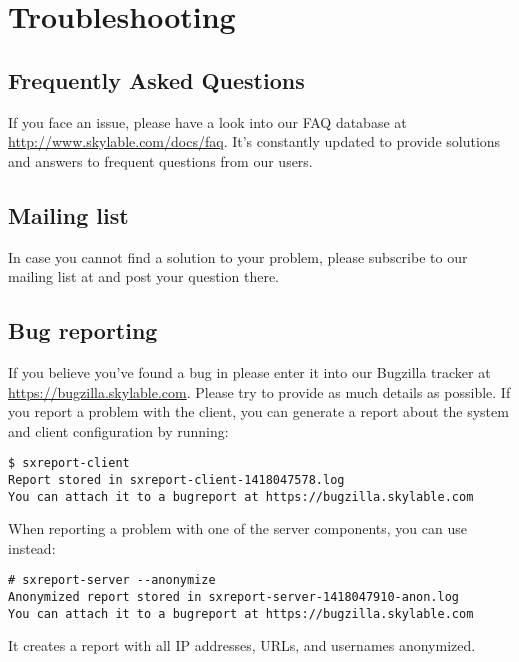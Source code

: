 \chapter{Troubleshooting}

\section{Frequently Asked Questions}
If you face an issue, please have a look into our FAQ database
at \url{http://www.skylable.com/docs/faq}. It's constantly
updated to provide solutions and answers to frequent questions
from our users.

\section{Mailing list}
In case you cannot find a solution to your problem, please
subscribe to our mailing list  at
 and post your question there.

\section{Bug reporting}
If you believe you've found a bug in \SX please enter it into
our Bugzilla tracker at \url{https://bugzilla.skylable.com}.
Please try to provide as much details as possible. If you
report a problem with the client, you can generate a report about
the system and client configuration by running:
\begin{lstlisting}
$ sxreport-client
Report stored in sxreport-client-1418047578.log
You can attach it to a bugreport at https://bugzilla.skylable.com
\end{lstlisting}
When reporting a problem with one of the server components, you can
use  instead:
\begin{lstlisting}
# sxreport-server --anonymize
Anonymized report stored in sxreport-server-1418047910-anon.log
You can attach it to a bugreport at https://bugzilla.skylable.com
\end{lstlisting}
It creates a report with all IP addresses, URLs, and usernames
anonymized.

